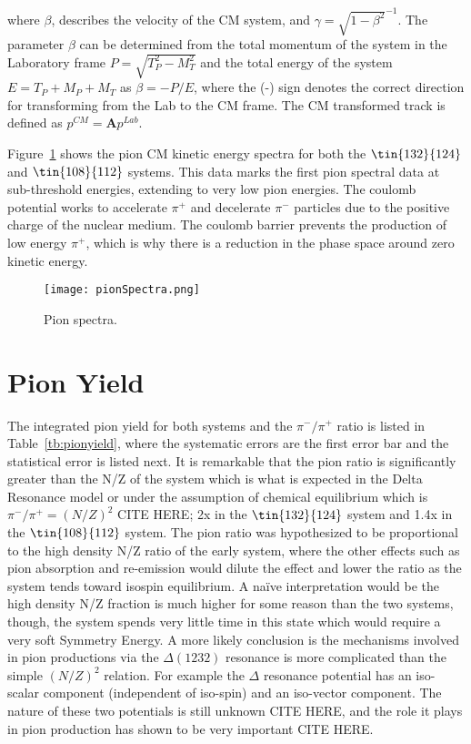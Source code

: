 where $\beta$, describes the velocity of the CM system, and $\gamma=\sqrt{1-\beta^2}^{-1}$. The parameter $\beta$ can be determined from the total momentum of the system in the Laboratory frame $P = \sqrt{ T_{P}^2 - M_{T}^2}$ and the total energy of the system $E = T_{P} + M_{P} + M_{T}$ as $\beta = -P/E$, where the (-) sign denotes the correct direction for transforming from the Lab to the CM frame. The CM transformed track is defined as $p^{CM} = \textbf{A}p^{Lab}$.




Figure~\ref{fig:pionspectra} shows the pion CM kinetic energy spectra for both the $\tin{132}{124}$ and $\tin{108}{112}$ systems. This data marks the first pion spectral data at sub-threshold energies, extending to very low pion energies. The coulomb potential works to accelerate $\pi^+$ and decelerate $\pi^-$ particles due to the positive charge of the nuclear medium. The coulomb barrier prevents the production of low energy $\pi^+$, which is why there is a reduction in the phase space around zero kinetic energy. 

\begin{figure}[!htb]
\centering
\texttt{[image: pionSpectra.png]}
\caption{Pion spectra. }
\label{fig:pionspectra}
\end{figure}



\section{Pion Yield}

The integrated pion yield for both systems and the $\pi^-/\pi^+$ ratio is listed in Table~\ref{tb:pionyield}, where the systematic errors are the first error bar and the statistical error is listed next. It is remarkable that the pion ratio is significantly greater than the N/Z of the system which is what is expected in the Delta Resonance model or under the assumption of chemical equilibrium which is $\pi^-/\pi^+ = (N/Z)^2$ CITE HERE; 2x in the $\tin{132}{124}$ system and 1.4x in the $\tin{108}{112}$ system. The pion ratio was hypothesized to be proportional to the high density N/Z ratio of the early system, where the other effects such as pion absorption and re-emission would dilute the effect and lower the ratio as the system tends toward isospin equilibrium. A na\"ive interpretation would be the high density N/Z fraction is much higher for some reason than the two systems, though, the system spends very little time in this state which would require a very soft Symmetry Energy. A more likely conclusion is the mechanisms involved in pion productions via the $\Delta(1232)$ resonance is more complicated than the simple $(N/Z)^2$ relation. For example the $\Delta$ resonance potential has an iso-scalar component (independent of iso-spin) and an iso-vector component. The nature of these two potentials is still unknown CITE HERE, and the role it plays in pion production has shown to be very important CITE HERE.


